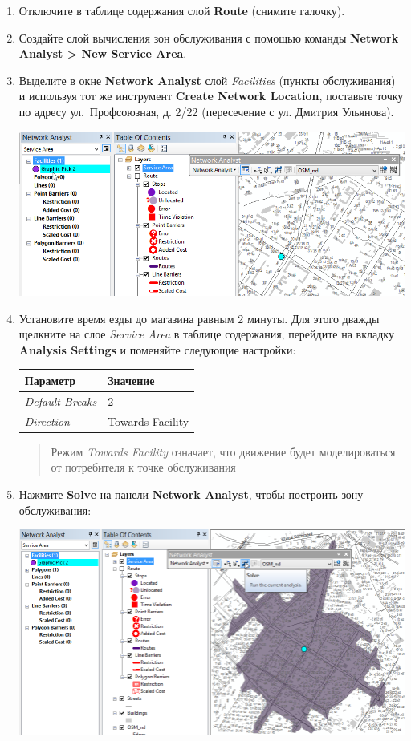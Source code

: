 \documentclass[]{book}
\theoremstyle{definition}
\theoremstyle{definition}
\theoremstyle{definition}
\theoremstyle{remark}
\begin{document}
\begin{enumerate}
\def\labelenumi{\arabic{enumi}.}
\item
  Отключите в таблице содержания слой \textbf{Route} (снимите галочку).
\item
  Создайте слой вычисления зон обслуживания с помощью команды
  \textbf{Network Analyst \textgreater{} New Service Area}.
\item
  Выделите в окне \textbf{Network Analyst} слой \emph{Facilities}
  (пункты обслуживания) и используя тот же инструмент \textbf{Create
  Network Location}, поставьте точку по адресу ул.~Профсоюзная, д. 2/22
  (пересечение с ул. Дмитрия Ульянова).

  \includegraphics{images/Ex12/image14.png}
\item
  Установите время езды до магазина равным 2 минуты. Для этого дважды
  щелкните на слое \emph{Service Area} в таблице содержания, перейдите
  на вкладку \textbf{Analysis Settings} и поменяйте следующие настройки:

  \begin{longtable}[]{@{}ll@{}}
  \toprule
  Параметр & Значение\tabularnewline
  \midrule
  \endhead
  \emph{Default Breaks} & 2\tabularnewline
  \emph{Direction} & Towards Facility\tabularnewline
  \bottomrule
  \end{longtable}

  \begin{quote}
  Режим \emph{Towards Facility} означает, что движение будет
  моделироваться от потребителя к точке обслуживания
  \end{quote}
\item
  Нажмите \textbf{Solve} на панели \textbf{Network Analyst}, чтобы
  построить зону обслуживания:

  \includegraphics{images/Ex12/image15.png}


\end{enumerate}
\end{document}

